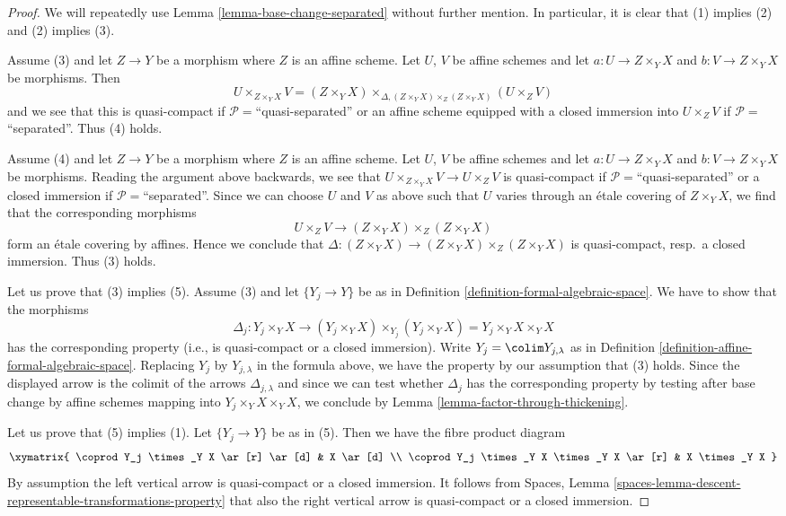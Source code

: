 \begin{proof}
We will repeatedly use
Lemma \ref{lemma-base-change-separated}
without further mention. In particular, it is clear that
(1) implies (2) and (2) implies (3).

\medskip\noindent
Assume (3) and let $Z \to Y$ be a morphism where $Z$ is an affine scheme.
Let $U$, $V$ be affine schemes and let $a : U \to Z \times_Y X$
and $b : V \to Z \times_Y X$ be morphisms. Then
$$
U \times_{Z \times_Y X} V =
(Z \times_Y X) \times_{\Delta, (Z \times_Y X) \times_Z (Z \times_Y X)}
(U \times_Z V)
$$
and we see that this is quasi-compact if $\mathcal{P} =$``quasi-separated''
or an affine scheme equipped with a closed immersion into
$U \times_Z V$ if $\mathcal{P} =$``separated''. Thus (4) holds.

\medskip\noindent
Assume (4) and let $Z \to Y$ be a morphism where $Z$ is an affine scheme.
Let $U$, $V$ be affine schemes and let $a : U \to Z \times_Y X$
and $b : V \to Z \times_Y X$ be morphisms. Reading the argument above
backwards, we see that $U \times_{Z \times_Y X} V \to U \times_Z V$
is quasi-compact if $\mathcal{P} =$``quasi-separated'' or a closed
immersion if $\mathcal{P} =$``separated''. Since we can choose $U$ and
$V$ as above such that $U$ varies through an
\'etale covering of $Z \times_Y X$, we find
that the corresponding morphisms
$$
U \times_Z V \to (Z \times_Y X) \times_Z (Z \times_Y X)
$$
form an \'etale covering by affines. Hence we conclude that
$\Delta : (Z \times_Y X) \to (Z \times_Y X) \times_Z (Z \times_Y X)$
is quasi-compact, resp.\ a closed immersion. Thus (3) holds.

\medskip\noindent
Let us prove that (3) implies (5). Assume (3) and let
$\{Y_j \to Y\}$ be as in
Definition \ref{definition-formal-algebraic-space}.
We have to show that the morphisms
$$
\Delta_j :
Y_j \times_Y X
\longrightarrow
(Y_j \times_Y X) \times_{Y_j} (Y_j \times_Y X) =
Y_j \times_Y X \times_Y X
$$
has the corresponding property (i.e., is quasi-compact or a closed immersion).
Write $Y_j = \colim Y_{j, \lambda}$ as in
Definition \ref{definition-affine-formal-algebraic-space}.
Replacing $Y_j$ by $Y_{j, \lambda}$ in the formula above, we have the
property by our assumption that (3) holds. Since the displayed arrow
is the colimit of the arrows $\Delta_{j, \lambda}$ and since we
can test whether $\Delta_j$ has the corresponding property by
testing after base change by affine schemes mapping into
$Y_j \times_Y X \times_Y X$, we conclude by
Lemma \ref{lemma-factor-through-thickening}.

\medskip\noindent
Let us prove that (5) implies (1). Let $\{Y_j \to Y\}$ be as in (5).
Then we have the fibre product diagram
$$
\xymatrix{
\coprod Y_j \times_Y X \ar[r] \ar[d] &
X \ar[d] \\
\coprod Y_j \times_Y X \times_Y X \ar[r] &
X \times_Y X
}
$$
By assumption the left vertical arrow is quasi-compact or a closed immersion.
It follows from
Spaces, Lemma \ref{spaces-lemma-descent-representable-transformations-property}
that also the right vertical arrow is quasi-compact or a
closed immersion.
\end{proof}







